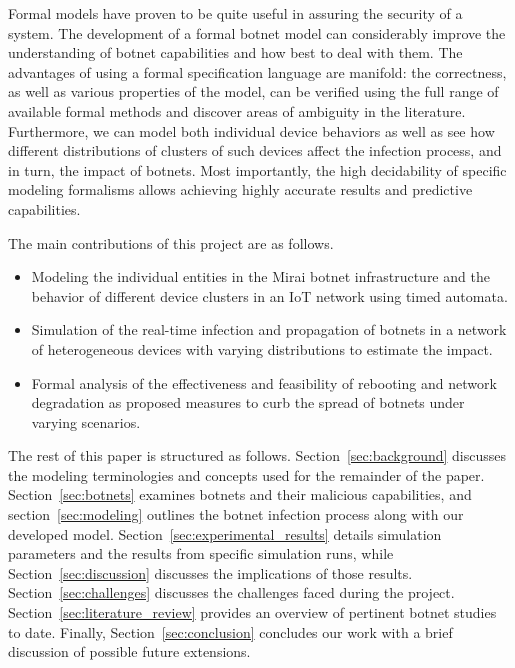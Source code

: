 Formal models have proven to be quite useful in assuring the security of a system. The development of a formal botnet model can considerably improve the understanding of botnet capabilities and how best to deal with them. The advantages of using a formal specification language are manifold: the correctness, as well as various properties of the model, can be verified using the full range of available formal methods and discover areas of ambiguity in the literature. Furthermore, we can model both individual device behaviors as well as see how different distributions of clusters of such devices affect the infection process, and in turn, the impact of botnets. Most importantly, the high decidability of specific modeling formalisms allows achieving highly accurate results and predictive capabilities.

The main contributions of this project are as follows.
\begin{itemize}
    \item Modeling the individual entities in the Mirai botnet infrastructure and the behavior of different device clusters in an IoT network using timed automata.
    \item Simulation of the real-time infection and propagation of botnets in a network of heterogeneous devices with varying distributions to estimate the impact.
    \item Formal analysis of the effectiveness and feasibility of rebooting and network degradation as proposed measures to curb the spread of botnets under varying scenarios. 
\end{itemize}
\par

The rest of this paper is structured as follows. Section~\ref{sec:background} discusses the modeling terminologies and concepts used for the remainder of the paper. Section~\ref{sec:botnets} examines botnets and their malicious capabilities, and section~\ref{sec:modeling} outlines the botnet infection process along with our developed model. Section~\ref{sec:experimental_results} details simulation parameters and the results from specific simulation runs, while Section~\ref{sec:discussion} discusses the implications of those results. Section~\ref{sec:challenges} discusses the challenges faced during the project. Section~\ref{sec:literature_review} provides an overview of pertinent botnet studies to date. Finally, Section~\ref{sec:conclusion} concludes our work with a brief discussion of possible future extensions.



